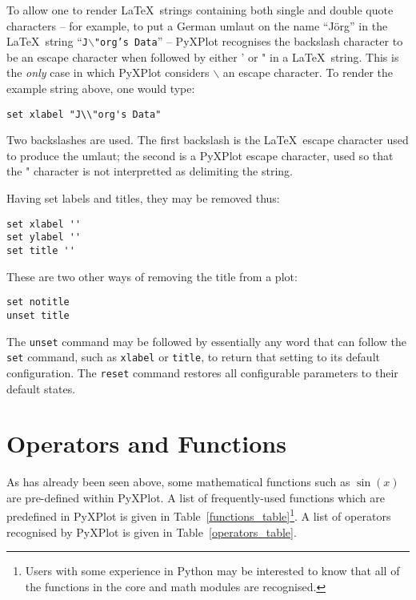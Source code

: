 \noindent To allow one to render \LaTeX\ strings containing both single and
double quote characters -- for example, to put a German umlaut on the name
``J\"org'' in the \LaTeX\ string ``\texttt{J$\backslash$"org's Data}'' --
PyXPlot recognises the backslash character to be an escape character when
followed by either ' or " in a \LaTeX\ string. This is the \textit{only} case
in which PyXPlot considers $\backslash$ an escape character. To render the
example string above, one would type:

\begin{verbatim}
set xlabel "J\\"org's Data"
\end{verbatim}

Two backslashes are used.  The first backslash is the \LaTeX\ escape character
used to produce the umlaut; the second is a PyXPlot escape character, used so
that the " character is not interpretted as delimiting the string. 

Having set labels and titles, they may be removed thus:

\begin{verbatim}
set xlabel ''
set ylabel ''
set title ''
\end{verbatim}

\noindent These are two other ways of removing the title from a plot:

\begin{verbatim}
set notitle
unset title
\end{verbatim}

The \texttt{unset} command may be
followed by essentially any word that can follow the \texttt{set} command, such
as \texttt{xlabel} or \texttt{title}, to return that setting to its default
configuration. The \texttt{reset} command restores all configurable parameters to their default states.

\section{Operators and Functions}

As has already been seen above, some mathematical functions such as $\sin(x)$ are
pre-defined within PyXPlot. A list of frequently-used functions which are
predefined in PyXPlot is given in Table~\ref{functions_table}\footnote{Users
with some experience in Python may be interested to know that all of the
functions in the core and math modules are recognised.}. A list of
operators recognised by PyXPlot is given in Table~\ref{operators_table}.

